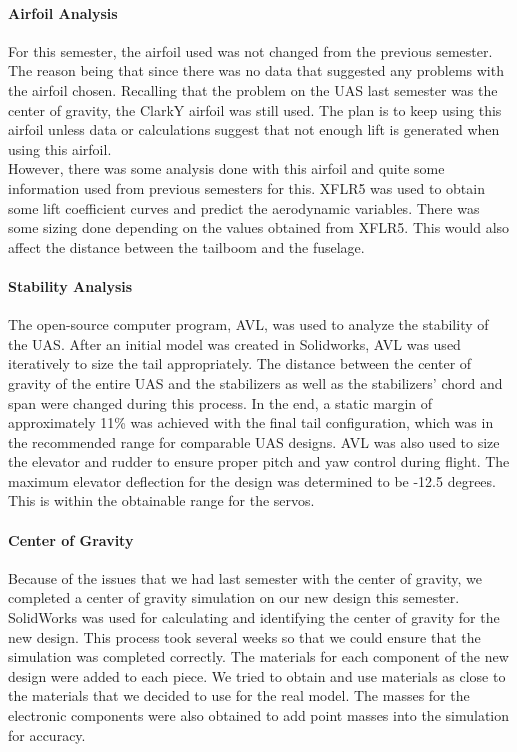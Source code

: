 \documentclass{article}
\begin{document}
\paragraph{Airfoil Analysis}
For this semester, the airfoil used was not changed from the previous semester. The reason being that since there was no data that suggested any problems with the airfoil chosen. Recalling that the problem on the UAS last semester was the center of gravity, the ClarkY airfoil was still used. The plan is to keep using this airfoil unless data or calculations suggest that not enough lift is generated when using this airfoil.\\
However, there was some analysis done with this airfoil and quite some information used from previous semesters for this. XFLR5 was used to obtain some lift coefficient curves and predict the aerodynamic variables. There was some sizing done depending on the values obtained from XFLR5. This would also affect the distance between the tailboom and the fuselage.\\

\paragraph{Stability Analysis}
The open-source computer program, AVL, was used to analyze the stability of the UAS. After an initial model was created in Solidworks, AVL was used iteratively to size the tail appropriately. The distance between the center of gravity of the entire UAS and the stabilizers as well as the stabilizers' chord and span were changed during this process. In the end, a static margin of approximately 11\% was achieved with the final tail configuration, which was in the recommended range for comparable UAS designs. AVL was also used to size the elevator and rudder to ensure proper pitch and yaw control during flight. The maximum elevator deflection for the design was determined to be -12.5 degrees. This is within the obtainable range for the servos. 

\paragraph{Center of Gravity}
Because of the issues that we had last semester with the center of gravity, we completed a center of gravity simulation on our new design this semester. SolidWorks was used for calculating and identifying the center of gravity for the new design. This process took several weeks so that we could ensure that the simulation was completed correctly. The materials for each component of the new design were added to each piece. We tried to obtain and use materials as close to the materials that we decided to use for the real model. The masses for the electronic components were also obtained to add point masses into the simulation for accuracy.\\
\end{document}
